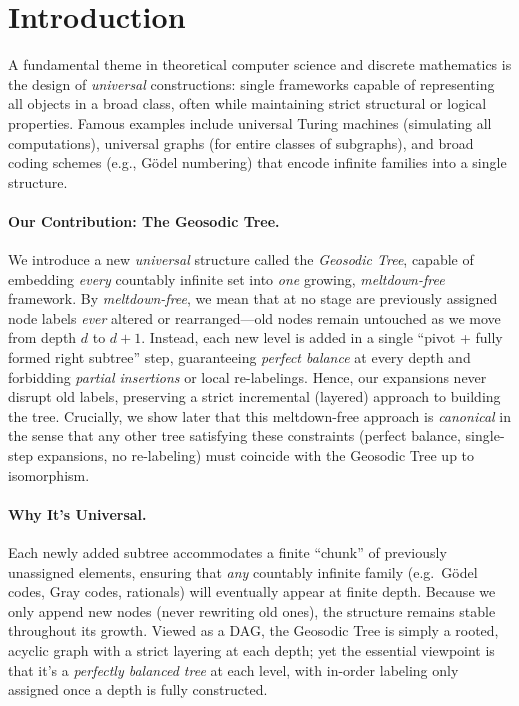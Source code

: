 \section{Introduction}
\label{sec:intro}

A fundamental theme in theoretical computer science and discrete mathematics 
is the design of \emph{universal} constructions: single frameworks capable 
of representing all objects in a broad class, often while maintaining 
strict structural or logical properties. Famous examples include 
universal Turing machines (simulating all computations), universal graphs 
(for entire classes of subgraphs), and broad coding schemes 
(e.g., G\"odel numbering) that encode infinite families into a single structure.

\paragraph{Our Contribution: The Geosodic Tree.}
We introduce a new \emph{universal} structure called the \emph{Geosodic Tree}, 
capable of embedding \emph{every} countably infinite set into \emph{one} 
growing, \emph{meltdown-free} framework. By \emph{meltdown-free}, we mean 
that at no stage are previously assigned node labels \emph{ever} altered 
or rearranged---old nodes remain untouched as we move from depth $d$ 
to $d+1$. Instead, each new level is added in a single ``pivot + fully formed 
right subtree'' step, guaranteeing \emph{perfect balance} at every depth 
and forbidding \emph{partial insertions} or local re-labelings. 
Hence, our expansions never disrupt old labels, preserving a strict 
incremental (layered) approach to building the tree.  Crucially, we show later that this meltdown-free
approach is \emph{canonical} in the sense that any other tree satisfying
these constraints (perfect balance, single-step expansions, no re-labeling)
must coincide with the Geosodic Tree up to isomorphism.

\paragraph{Why It’s Universal.}
Each newly added subtree accommodates a finite ``chunk'' of previously unassigned elements, 
ensuring that \emph{any} countably infinite family 
(e.g.\ G\"odel codes, Gray codes, rationals) 
will eventually appear at finite depth. Because we only append new nodes (never rewriting old ones),
the structure remains stable throughout its growth. Viewed as a DAG, the Geosodic Tree 
is simply a rooted, acyclic graph with a strict layering at each depth; yet the essential 
viewpoint is that it’s a \emph{perfectly balanced tree} at each level, with in-order labeling 
only assigned once a depth is fully constructed.

